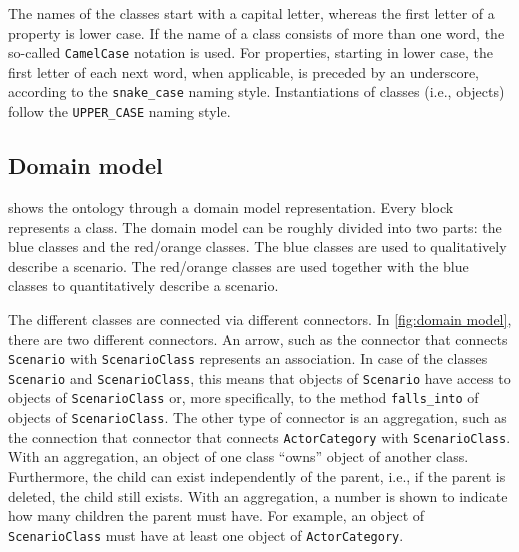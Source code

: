 \documentclass[10pt,final,a4paper,oneside,onecolumn]{article}
\theoremstyle{plain}\newtheorem{definition}{Definition}[section]    %
\theoremstyle{definition}\newtheorem{example}{Example}[section]     %
\theoremstyle{remark}\newtheorem{remarkenv}{Remark}[section]        %
\begin{document}
\cbstart
The names of the classes start with a capital letter, whereas the first letter of a property is lower case. If the name of a class consists of more than one word, the so-called \texttt{CamelCase} notation is used. For properties, starting in lower case, the first letter of each next word, when applicable, is preceded by an underscore, according to the \texttt{snake\_case} naming style. Instantiations of classes (i.e., objects) follow the \texttt{UPPER\_CASE} naming style.
\cbend

\subsection{Domain model}
\label{sec:domain model}

\cbstart

 shows the ontology through a domain model representation. Every block represents a class. The domain model can be roughly divided into two parts: the blue classes and the red/orange classes. The blue classes are used to qualitatively describe a scenario. The red/orange classes are used together with the blue classes to quantitatively describe a scenario.

The different classes are connected via different connectors. In \cref{fig:domain model}, there are two different connectors. An arrow, such as the connector that connects \texttt{Scenario} with \texttt{ScenarioClass} represents an association. In case of the classes \texttt{Scenario} and \texttt{ScenarioClass}, this means that objects of \texttt{Scenario} have access to objects of \texttt{ScenarioClass} or, more specifically, to the method \texttt{falls\_into} of objects of \texttt{ScenarioClass}. The other type of connector is an aggregation, such as the connection that connector that connects \texttt{ActorCategory} with \texttt{ScenarioClass}. With an aggregation, an object of one class ``owns'' object of another class. Furthermore, the child can exist independently of the parent, i.e., if the parent is deleted, the child still exists. With an aggregation, a number is shown to indicate how many children the parent must have. For example, an object of \texttt{ScenarioClass} must have at least one object of \texttt{ActorCategory}.
\end{document}
